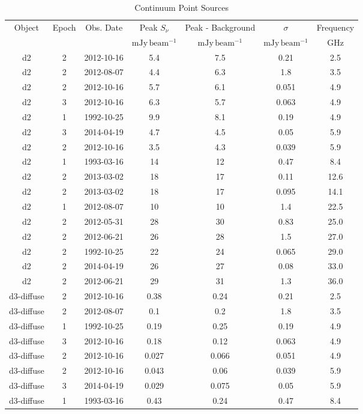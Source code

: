 \begin{table*}[htp]
\caption{Continuum Point Sources}
\begin{tabular}{ccccccc}
\label{tab:contsrcs_full}
Object & Epoch & Obs. Date & Peak $S_{\nu}$ & Peak - Background & $\sigma$ & Frequency \\
 &  &  & $\mathrm{mJy\,beam^{-1}}$ & $\mathrm{mJy\,beam^{-1}}$ & $\mathrm{mJy\,beam^{-1}}$ & $\mathrm{GHz}$ \\
\hline
d2 & 2 & 2012-10-16 & 5.4 & 7.5 & 0.21 & 2.5 \\
d2 & 2 & 2012-08-07 & 4.4 & 6.3 & 1.8 & 3.5 \\
d2 & 2 & 2012-10-16 & 5.7 & 6.1 & 0.051 & 4.9 \\
d2 & 3 & 2012-10-16 & 6.3 & 5.7 & 0.063 & 4.9 \\
d2 & 1 & 1992-10-25 & 9.9 & 8.1 & 0.19 & 4.9 \\
d2 & 3 & 2014-04-19 & 4.7 & 4.5 & 0.05 & 5.9 \\
d2 & 2 & 2012-10-16 & 3.5 & 4.3 & 0.039 & 5.9 \\
d2 & 1 & 1993-03-16 & 14 & 12 & 0.47 & 8.4 \\
d2 & 2 & 2013-03-02 & 18 & 17 & 0.11 & 12.6 \\
d2 & 2 & 2013-03-02 & 18 & 17 & 0.095 & 14.1 \\
d2 & 1 & 2012-08-07 & 10 & 10 & 1.4 & 22.5 \\
d2 & 2 & 2012-05-31 & 28 & 30 & 0.83 & 25.0 \\
d2 & 2 & 2012-06-21 & 26 & 28 & 1.5 & 27.0 \\
d2 & 2 & 1992-10-25 & 22 & 24 & 0.065 & 29.0 \\
d2 & 2 & 2014-04-19 & 26 & 27 & 0.08 & 33.0 \\
d2 & 2 & 2012-06-21 & 29 & 31 & 1.3 & 36.0 \\
d3-diffuse & 2 & 2012-10-16 & 0.38 & 0.24 & 0.21 & 2.5 \\
d3-diffuse & 2 & 2012-08-07 & 0.1 & 0.2 & 1.8 & 3.5 \\
d3-diffuse & 1 & 1992-10-25 & 0.19 & 0.25 & 0.19 & 4.9 \\
d3-diffuse & 3 & 2012-10-16 & 0.18 & 0.12 & 0.063 & 4.9 \\
d3-diffuse & 2 & 2012-10-16 & 0.027 & 0.066 & 0.051 & 4.9 \\
d3-diffuse & 2 & 2012-10-16 & 0.043 & 0.06 & 0.039 & 5.9 \\
d3-diffuse & 3 & 2014-04-19 & 0.029 & 0.075 & 0.05 & 5.9 \\
d3-diffuse & 1 & 1993-03-16 & 0.43 & 0.24 & 0.47 & 8.4 \\

\end{tabular}
\end{table*}

